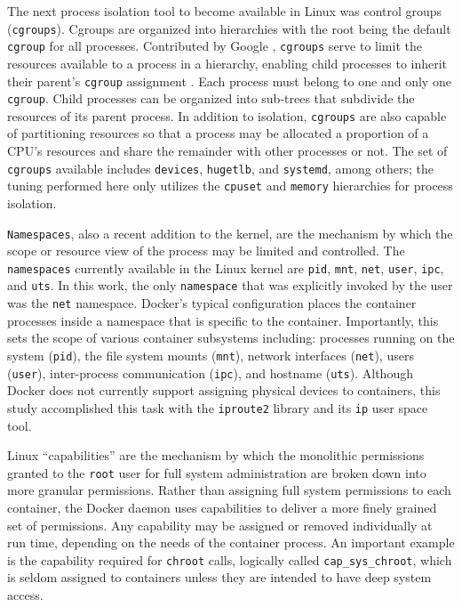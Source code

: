 The next process isolation tool to become available in Linux was control groups (\texttt{cgroups}).  
Cgroups are organized into hierarchies with the root being the default \texttt{cgroup} for all processes. 
Contributed by Google \autocite{googlecgroups}, \texttt{cgroups} serve to limit the resources available to a process in a hierarchy, enabling child processes to inherit their parent's \texttt{cgroup} assignment \autocite{kernelcgroups}. 
Each process must belong to one and only one \texttt{cgroup}. 
Child processes can be organized into sub-trees that subdivide the resources of its parent process.  
In addition to isolation, \texttt{cgroups} are also capable of partitioning resources so that a process may be allocated a proportion of a CPU's resources and share the remainder with other processes or not.
The set of \texttt{cgroups} available includes \texttt{devices}, \texttt{hugetlb}, and \texttt{systemd}, among others; the tuning performed here only utilizes the \texttt{cpuset} and \texttt{memory} hierarchies for process isolation.

\texttt{Namespaces}, also a recent addition to the kernel, are the mechanism by which the scope or resource view of the process may be limited and controlled.
The \texttt{namespaces} currently available in the Linux kernel are \texttt{pid}, \texttt{mnt}, \texttt{net}, \texttt{user}, \texttt{ipc}, and \texttt{uts}.
In this work, the only \texttt{namespace} that was explicitly invoked by the user was the \texttt{net} namespace.  
Docker's typical configuration places the container processes inside a namespace that is specific to the container. 
Importantly, this sets the scope of various container subsystems including: processes running on the system (\texttt{pid}), the file system mounts (\texttt{mnt}), network interfaces (\texttt{net}), users (\texttt{user}), inter-process communication (\texttt{ipc}), and hostname (\texttt{uts}).
Although Docker does not currently support assigning physical devices to containers, this study accomplished this task with the \texttt{iproute2} library and its \texttt{ip} user space tool.  

Linux ``capabilities'' are the mechanism by which the monolithic permissions granted to the \texttt{root} user for full system administration are broken down into more granular permissions.  
Rather than assigning full system permissions to each container, the Docker daemon uses capabilities to deliver a more finely grained set of permissions.
Any capability may be assigned or removed individually at run time, depending on the needs of the container process.
An important example is the capability required for \texttt{chroot} calls, logically called \texttt{cap\_sys\_chroot}, which is seldom assigned to containers unless they are intended to have deep system access.

